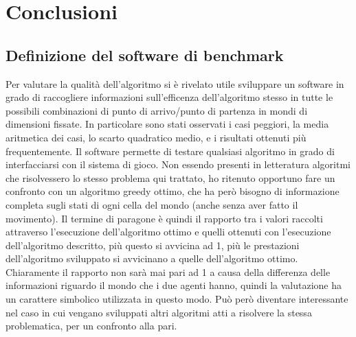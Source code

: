 \chapter{Conclusioni}
\section{Definizione del software di benchmark}
Per valutare la qualità dell'algoritmo si è rivelato utile sviluppare un software in grado di raccogliere informazioni sull'efficenza dell'algoritmo stesso in tutte le possibili combinazioni di punto di arrivo/punto di partenza in mondi di dimensioni fissate. In particolare sono stati osservati i casi peggiori, la media aritmetica dei casi, lo scarto quadratico medio, e i risultati ottenuti più frequentemente. Il software permette di testare qualsiasi algoritmo in grado di interfacciarsi con il sistema di gioco. Non essendo presenti in letteratura algoritmi che risolvessero lo stesso problema qui trattato, ho ritenuto opportuno fare un confronto con un algoritmo greedy ottimo, che ha però bisogno di informazione completa sugli stati di ogni cella del mondo (anche senza aver fatto il movimento). Il termine di paragone è quindi il rapporto tra i valori raccolti attraverso l'esecuzione dell'algoritmo ottimo e quelli ottenuti con l'esecuzione dell'algoritmo descritto, più questo si avvicina ad 1, più le prestazioni dell'algoritmo sviluppato si avvicinano a quelle dell'algoritmo ottimo. Chiaramente il rapporto non sarà mai pari ad 1 a causa della differenza delle informazioni riguardo il mondo che i due agenti hanno, quindi la valutazione ha un carattere simbolico utilizzata in questo modo. Può però diventare interessante nel caso in cui vengano sviluppati altri algoritmi atti a risolvere la stessa problematica, per un confronto alla pari.

